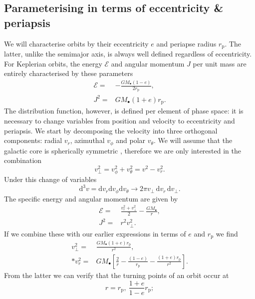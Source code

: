 \documentclass[useAMS,usedcolumn,usegraphicx,usenatbib]{mn2e}
\newcommand{\sub}[1]{\ensuremath{_\mathrm{#1}}}
\newcommand{\dd}{\ensuremath{\mathrm{d}}}
\begin{document}
\subsection{Parameterising in terms of eccentricity \& periapsis}

We will characterise orbits by their eccentricity $e$ and periapse radius $r\sub{p}$. The latter, unlike the semimajor axis, is always well defined regardless of eccentricity. For Keplerian orbits, the energy $\mathcal{E}$ and angular momentum $J$ per unit mass are entirely characterised by these parameters
\begin{align}
\label{eq:Energy_ecc}
\mathcal{E} = {} & -\frac{GM_\bullet(1 - e)}{2r\sub{p}},\\
J^2 = {} & GM_\bullet(1 + e)r\sub{p}.
\end{align}
The distribution function, however, is defined per element of phase space: it is necessary to change variables from position and velocity to eccentricity and periapsis. We start by decomposing the velocity into three orthogonal components: radial $v_r$, azimuthal $v_\phi$ and polar $v_\theta$. We will assume that the galactic core is spherically symmetric \citep{Genzel2003, Schodel2007}, therefore we are only interested in the combination
\begin{equation}
v_\perp^2 = v_\phi^2 + v_\theta^2 = v^2 - v_r^2.
\end{equation}
Under this change of variables
\begin{equation}
\dd^3v = \dd v_r \dd v_\phi \dd v_\theta \rightarrow 2\pi v_\perp \,\dd v_r \,\dd v_\perp.
\end{equation}
The specific energy and angular momentum are given by
\begin{align}
\mathcal{E} = {} & \frac{v_r^2 + v_\perp^2}{2} - \frac{GM_\bullet}{r},\\
J^2 = {} & r^2 v_\perp^2.
\end{align}
If we combine these with our earlier expressions in terms of $e$ and $r\sub{p}$ we find
\begin{align}
v_\perp^2 = {} & \frac{GM_\bullet(1 + e)r\sub{p}}{r^2}, \nonumber \\*
v_r^2 = {} & GM_\bullet\left[\frac{2}{r} - \frac{(1 - e)}{r\sub{p}} - \frac{(1 + e)r\sub{p}}{r^2}\right].
\end{align}
From the latter we can verify that the turning points of an orbit occur at
\begin{equation}
r = r\sub{p}, \: \frac{1+e}{1-e}r\sub{p};
\end{equation}
\end{document}

